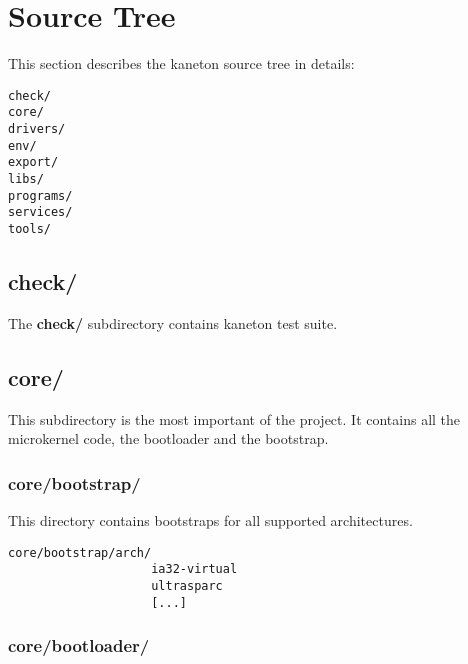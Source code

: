 
%
%

\chapter{Source Tree}

This section describes the kaneton source tree in details:

\begin{verbatim}
check/
core/
drivers/
env/
export/
libs/
programs/
services/
tools/
\end{verbatim}

%
%

\section{check/}

The \textbf{check/} subdirectory contains kaneton test suite.

%
%

\section{core/}

This subdirectory is the most important of the project. It contains
all the microkernel code, the bootloader and the bootstrap.

%
%

\subsection{core/bootstrap/}

This directory contains bootstraps for all supported architectures.

\begin{verbatim}
core/bootstrap/arch/
                    ia32-virtual
                    ultrasparc
                    [...]
\end{verbatim}

%
%

\subsection{core/bootloader/}

